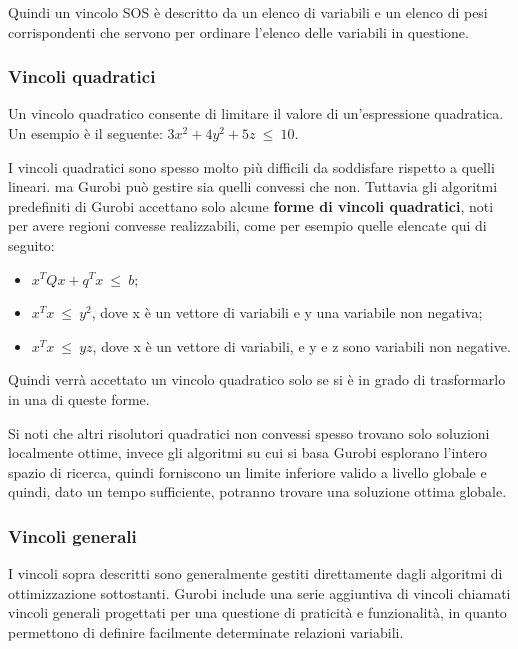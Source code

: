 Quindi un vincolo SOS è descritto da un elenco di variabili e un elenco di pesi corrispondenti che servono per ordinare l'elenco delle variabili in questione.

\subsubsection*{Vincoli quadratici}
Un vincolo quadratico consente di limitare il valore di un'espressione quadratica.
Un esempio è il seguente:
$3x^2 + 4y^2 + 5z ~ \leq ~ 10$.

I vincoli quadratici sono spesso molto più difficili da soddisfare rispetto a quelli lineari. ma Gurobi può gestire sia quelli convessi che non.
Tuttavia gli algoritmi predefiniti di Gurobi accettano solo alcune \textbf{forme di vincoli quadratici}, noti per avere regioni convesse realizzabili, come per esempio quelle elencate qui di seguito:
\begin{itemize}
\item $x^T Q x + q^T x ~ \leq ~ b$;
\item $x^T x ~ \leq ~ y^2$, dove x è un vettore di variabili e y una variabile non negativa;
\item $x^T x ~ \leq ~ y z$, dove x è un vettore di variabili, e y e z sono variabili non negative.
\end{itemize}
Quindi verrà accettato un vincolo quadratico solo se si è in grado di trasformarlo in una di queste forme.

Si noti che altri risolutori quadratici non convessi spesso trovano solo soluzioni localmente ottime, invece gli algoritmi su cui si basa Gurobi esplorano l'intero spazio di ricerca, quindi forniscono un limite inferiore valido a livello globale e quindi, dato un tempo sufficiente, potranno trovare una soluzione ottima globale.

\subsubsection*{Vincoli generali}
I vincoli sopra descritti sono generalmente gestiti direttamente dagli algoritmi di ottimizzazione sottostanti. Gurobi include una serie aggiuntiva di vincoli chiamati vincoli generali progettati per una questione di praticità e funzionalità, in quanto permettono di definire facilmente determinate relazioni variabili.

